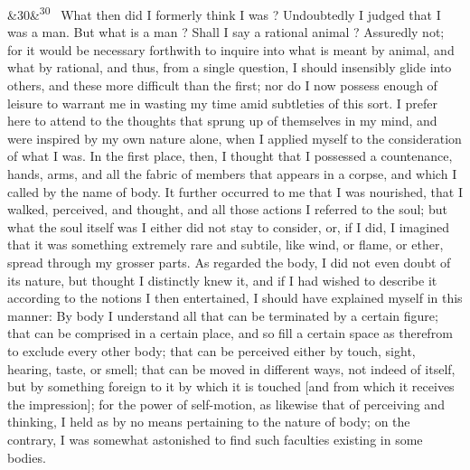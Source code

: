 \documentclass[12pt]{article}
\newcommand{\para}[1][]{\par\noindent\ifx&#1&\else\textsuperscript{\footnotesize #1}~\fi}
\begin{document}
\para[30] What then did I formerly think I was ? Undoubtedly I judged that I was a man. But what is a man ? Shall I say a rational animal ? Assuredly not; for it would be necessary forthwith to inquire into what is meant by animal, and what by rational, and thus, from a single question, I should insensibly glide into others, and these more difficult than the first; nor do I now possess enough of leisure to warrant me in wasting my time amid subtleties of this sort. I prefer here to attend to the thoughts that sprung up of themselves in my mind, and were inspired by my own nature alone, when I applied myself to the consideration of what I was. In the first place, then, I thought that I possessed a countenance, hands, arms, and all the fabric of members that appears in a corpse, and which I called by the name of body. It further occurred to me that I was nourished, that I walked, perceived, and thought, and all those actions I referred to the soul; but what the soul itself was I either did not stay to consider, or, if I did, I imagined that it was something extremely rare and subtile, like wind, or flame, or ether, spread through my grosser parts. As regarded the body, I did not even doubt of its nature, but thought I distinctly knew it, and if I had wished to describe it according to the notions I then entertained, I should have explained myself in this manner: By body I understand all that can be terminated by a certain figure; that can be comprised in a certain place, and so fill a certain space as therefrom to exclude every other body; that can be perceived either by touch, sight, hearing, taste, or smell; that can be moved in different ways, not indeed of itself, but by something foreign to it by which it is touched [and from which it receives the impression]; for the power of self-motion, as likewise that of perceiving and thinking, I held as by no means pertaining to the nature of body; on the contrary, I was somewhat astonished to find such faculties existing in some bodies.
\end{document}
